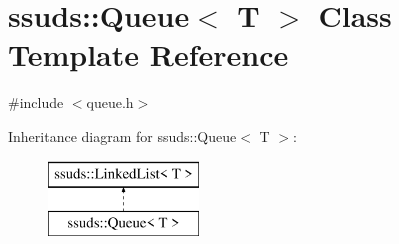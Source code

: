 \hypertarget{classssuds_1_1_queue}{}\section{ssuds\+::Queue$<$ T $>$ Class Template Reference}
\label{classssuds_1_1_queue}


{\ttfamily \#include $<$queue.\+h$>$}

Inheritance diagram for ssuds\+::Queue$<$ T $>$\+:\begin{figure}[H]
\begin{center}
\leavevmode
\includegraphics[height=2.000000cm]{classssuds_1_1_queue}
\end{center}
\end{figure}
